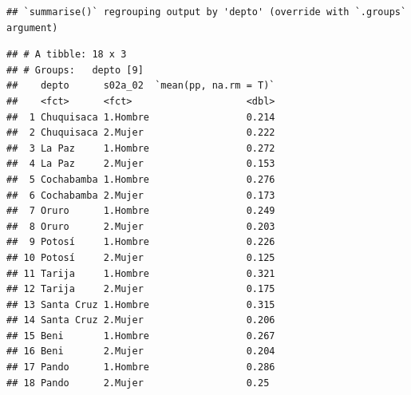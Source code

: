 \documentclass[
]{article}
\newenvironment{Shaded}{\begin{snugshade}}{\end{snugshade}}
\newcommand{\CommentTok}[1]{\textcolor[rgb]{0.56,0.35,0.01}{\textit{#1}}}
\newcommand{\DataTypeTok}[1]{\textcolor[rgb]{0.13,0.29,0.53}{#1}}
\newcommand{\DecValTok}[1]{\textcolor[rgb]{0.00,0.00,0.81}{#1}}
\newcommand{\KeywordTok}[1]{\textcolor[rgb]{0.13,0.29,0.53}{\textbf{#1}}}
\newcommand{\NormalTok}[1]{#1}
\newcommand{\OperatorTok}[1]{\textcolor[rgb]{0.81,0.36,0.00}{\textbf{#1}}}
\newcommand{\StringTok}[1]{\textcolor[rgb]{0.31,0.60,0.02}{#1}}
\begin{document}
\begin{Shaded}
\end{Shaded}

\begin{verbatim}
## `summarise()` regrouping output by 'depto' (override with `.groups` argument)
\end{verbatim}

\begin{verbatim}
## # A tibble: 18 x 3
## # Groups:   depto [9]
##    depto      s02a_02  `mean(pp, na.rm = T)`
##    <fct>      <fct>                    <dbl>
##  1 Chuquisaca 1.Hombre                 0.214
##  2 Chuquisaca 2.Mujer                  0.222
##  3 La Paz     1.Hombre                 0.272
##  4 La Paz     2.Mujer                  0.153
##  5 Cochabamba 1.Hombre                 0.276
##  6 Cochabamba 2.Mujer                  0.173
##  7 Oruro      1.Hombre                 0.249
##  8 Oruro      2.Mujer                  0.203
##  9 Potosí     1.Hombre                 0.226
## 10 Potosí     2.Mujer                  0.125
## 11 Tarija     1.Hombre                 0.321
## 12 Tarija     2.Mujer                  0.175
## 13 Santa Cruz 1.Hombre                 0.315
## 14 Santa Cruz 2.Mujer                  0.206
## 15 Beni       1.Hombre                 0.267
## 16 Beni       2.Mujer                  0.204
## 17 Pando      1.Hombre                 0.286
## 18 Pando      2.Mujer                  0.25
\end{verbatim}

\begin{Shaded}
\end{Shaded}
\end{document}
